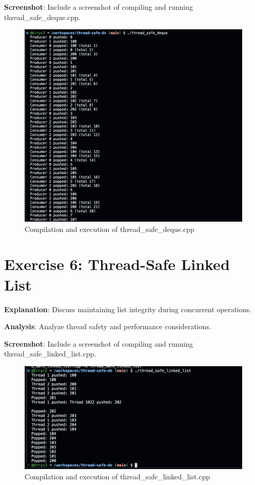 \textbf{Screenshot}: Include a screenshot of compiling and running thread_safe_deque.cpp.
\begin{figure}[h]
    \centering
    \includegraphics[width=\textwidth]{4_screenshot.png}
    \caption{Compilation and execution of thread_safe_deque.cpp}
\end{figure}

\section{Exercise 6: Thread-Safe Linked List}


\textbf{Explanation}: Discuss maintaining list integrity during concurrent operations.

\textbf{Analysis}: Analyze thread safety and performance considerations.

\textbf{Screenshot}: Include a screenshot of compiling and running thread_safe_linked_list.cpp.
\begin{figure}[h]
    \centering
    \includegraphics[width=\textwidth]{5_screenshot.png}
    \caption{Compilation and execution of thread_safe_linked_list.cpp}
\end{figure}

